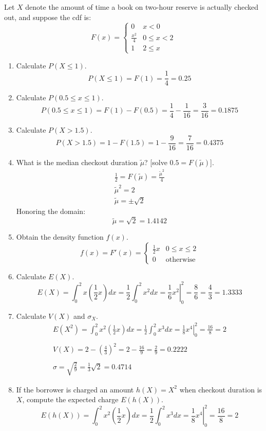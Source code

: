 \documentclass[letterpaper,12pt,fleqn]{article}
\newcommand{\m}{\tilde{\mu}}
\renewcommand{\o}{\sigma}
\begin{document}
Let \(X\) denote the amount of time a book on two-hour reserve is actually checked out, and suppose the cdf is:
\[F(x)=\begin{cases}
0 & x<0 \\
\frac{x^2}{4} & 0\le x<2 \\
1 & 2\le x
\end{cases}\]
\begin{enumerate}[label={\alph*)}]
\item Calculate \(P(X\le1)\).
  \[P(X\le1)=F(1)=\frac{1}{4}=0.25\]
\item Calculate \(P(0.5\le x\le1)\).
  \[P(0.5\le x\le1)=F(1)-F(0.5)=\frac{1}{4}-\frac{1}{16}=\frac{3}{16}=0.1875\]
\item Calculate \(P(X>1.5)\).
  \[P(X>1.5)=1-F(1.5)=1-\frac{9}{16}=\frac{7}{16}=0.4375\]
\item What is the median checkout duration \(\m\)? [solve \(0.5=F(\m)\)].
  \begin{gather*}
    \frac{1}{2}=F(\m)=\frac{\m^2}{4} \\
    \m^2=2 \\
    \m=\pm\sqrt{2}
  \end{gather*}
  Honoring the domain:
  \[\m=\sqrt{2}=1.4142\]
\item Obtain the density function \(f(x)\).
  \[f(x)=F'(x)=\begin{cases}
  \frac{1}{2}x & 0\le x\le 2 \\
  0 & \text{otherwise}
  \end{cases}\]
\item Calculate \(E(X)\).
  \[E(X)=\int_0^2x\left(\frac{1}{2}x\right)dx=\frac{1}{2}\int_0^2x^2dx=\left.\frac{1}{6}x^2\right|_0^2=\frac{8}{6}=
  \frac{4}{3}=1.3333\]
\item Calculate \(V(X)\) and \(\o_X\).
  \begin{gather*}
    E(X^2)=\int_0^2x^2\left(\frac{1}{2}x\right)dx=\frac{1}{2}\int_0^2x^3dx=\left.\frac{1}{8}x^4\right|_0^2=\frac{16}{8}=2 \\
    \\
    V(X)=2-\left(\frac{4}{3}\right)^2=2-\frac{16}{9}=\frac{2}{9}=0.2222 \\
    \\
    \o=\sqrt{\frac{2}{9}}=\frac{1}{3}\sqrt{2}=0.4714
  \end{gather*}
\item If the borrower is charged an amount \(h(X)=X^2\) when checkout duration is \(X\), compute the expected charge
  \(E(h(X))\).
  \[E(h(X))=\int_0^2x^2\left(\frac{1}{2}x\right)dx=\frac{1}{2}\int_0^2x^3dx=\left.\frac{1}{8}x^4\right|_0^2=\frac{16}{8}=2\]
\end{enumerate}
\end{document}
